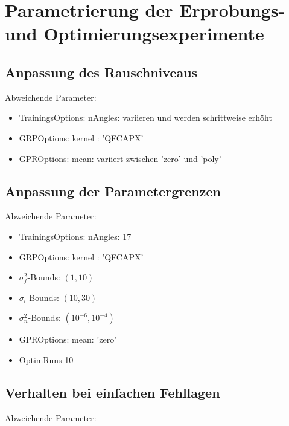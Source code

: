 %

\chapter{Parametrierung der Erprobungs- und Optimierungsexperimente}\label{ch:param-exp}






\section{Anpassung des Rauschniveaus}\label{sec:paramexp3}


Abweichende Parameter:

\begin{itemize}
	\item TrainingsOptions: nAngles: variieren und werden schrittweise erhöht
	\item GRPOptions: kernel : 'QFCAPX'
	\item GPROptions: mean: variiert zwischen 'zero' und 'poly'
\end{itemize}


\section{Anpassung der Parametergrenzen}\label{sec:paramexp4}


Abweichende Parameter:

\begin{itemize}
	\item TrainingsOptions: nAngles: 17
	\item GRPOptions: kernel : 'QFCAPX'
	\item $\sigma_f^2$-Bounds: $(1,10)$
	\item $\sigma_l$-Bounds: $(10,30)$
	\item $\sigma_n^2$-Bounds: $(10^{-6},10^{-4})$
	\item GPROptions: mean: 'zero'
	\item OptimRuns 10
\end{itemize}


\section{Verhalten bei einfachen Fehllagen}\label{sec:paramexp5}


Abweichende Parameter:

